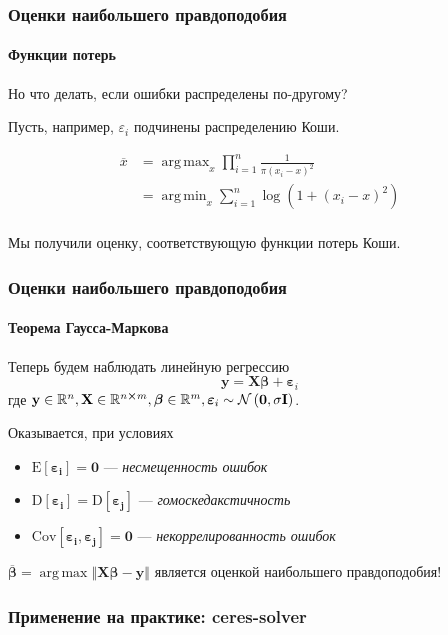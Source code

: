\documentclass[notheorems,aspectratio=169]{beamer}
\DeclareMathOperator*{\argmax}{arg\,max}
\DeclareMathOperator*{\argmin}{arg\,min}
\begin{document}
\begin{frame}
  \frametitle{Оценки наибольшего правдоподобия}
  \framesubtitle{Функции потерь}
  Но что делать, если ошибки распределены по-другому?

  Пусть, например, $\varepsilon_i$ подчинены распределению Коши.

  \begin{align*}
    \overline{x} & =\argmax_{x}\prod_{i=1}^n\frac{1}{\pi \left(x_i-x\right)^2} \\
                 & =\argmin_{x}\sum_{i=1}^n \log\left(1+\left(x_i-x\right)^2\right) \\
  \end{align*}
  
  Мы получили оценку, соответствующую функции потерь Коши.
\end{frame}

\begin{frame}
  \frametitle{Оценки наибольшего правдоподобия}
  \framesubtitle{Теорема Гаусса-Маркова}
  Теперь будем наблюдать линейную регрессию 
  $$\mathbf{y}=\mathbf{X}\boldsymbol{\beta}+\boldsymbol{\varepsilon}_i$$
  где $\mathbf{y}\in\mathbb{R}^n, \mathbf{X}\in\mathbb{R}^{n\cross m}, \boldsymbol{\beta}\in\mathbb{R}^m, \boldsymbol{\varepsilon}_i\sim\mathcal{N}\left(\mathbf{0},\sigma \mathbf{I}\right)$.

  Оказывается, при условиях

  \begin{itemize}
    \item $\mathrm{E}\left[\boldsymbol{\varepsilon_i}\right]=\mathbf{0}$ --- \emph{несмещенность ошибок}
    \item $\mathrm{D}\left[\boldsymbol{\varepsilon_i}\right]=\mathrm{D}\left[\boldsymbol{\varepsilon_j}\right]$ --- \emph{гомоскедакстичность}
   \item $\mathrm{Cov}\left[\boldsymbol{\varepsilon_i},\boldsymbol{\varepsilon_j}\right]=\mathbf{0}$ --- \emph{некоррелированность ошибок}
  \end{itemize}

  $\overline{\boldsymbol{\beta}}=\argmax{\left\Vert\mathbf{X}\boldsymbol{\beta}-\mathbf{y}\right\Vert}$ является оценкой наибольшего правдоподобия!
\end{frame}

\begin{frame}
  \frametitle{Применение на практике: ceres-solver}
  
\end{frame}
\end{document}
